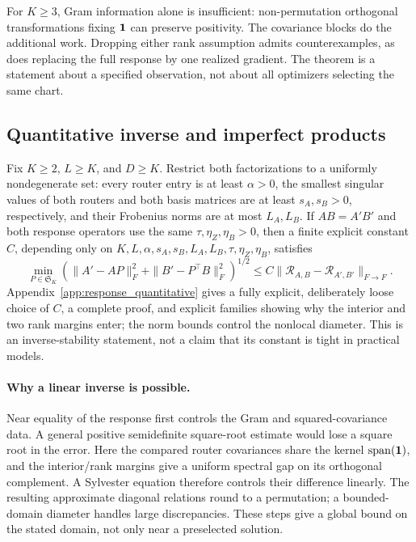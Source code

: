 For $K\ge3$, Gram information alone is insufficient: non-permutation orthogonal
transformations fixing $\mathbf{1}$ can preserve positivity. The covariance
blocks do the additional work. Dropping either rank assumption admits
counterexamples, as does replacing the full response by one realized
gradient. The theorem is a statement about a specified observation, not
about all optimizers selecting the same chart.

\subsection{Quantitative inverse and imperfect products}
\label{sec:quantitative}

\begin{corollary}
\label{cor:response_stability}
Fix \(K\ge2\), \(L\ge K\), and \(D\ge K\).  Restrict both
factorizations to a uniformly nondegenerate set: every router entry is at
least \(\alpha>0\), the smallest singular values of both routers and both
basis matrices are at least \(s_A,s_B>0\), respectively, and their Frobenius
norms are at most \(L_A,L_B\).  If \(AB=A'B'\) and both response operators
use the same \(\tau,\eta_Z,\eta_B>0\), then a finite explicit constant \(C\),
depending only on
\(K,L,\alpha,s_A,s_B,L_A,L_B,\tau,\eta_Z,\eta_B\), satisfies
\begin{equation}
 \min_{P\in\mathfrak S_K}
 \left(\|A'-AP\|_F^2+\|B'-P^\top B\|_F^2\right)^{1/2}
 \le C\|\mathcal R_{A,B}-\mathcal R_{A',B'}\|_{F\to F}.
 \label{eq:response_stability_main}
\end{equation}
Appendix~\ref{app:response_quantitative} gives a fully explicit, deliberately
loose choice of \(C\), a complete proof, and explicit families showing why
the interior and two rank margins enter; the norm bounds control the nonlocal
diameter.  This is an inverse-stability statement, not a claim that its
constant is tight in practical models.
\end{corollary}


\paragraph{Why a linear inverse is possible.}
Near equality of the response first controls the Gram and squared-covariance
data. A general positive semidefinite square-root estimate would lose a
square root in the error. Here the compared router covariances share the
kernel $\operatorname{span}(\mathbf{1})$, and the interior/rank margins give
a uniform spectral gap on its orthogonal complement. A Sylvester equation
therefore controls their difference linearly. The resulting approximate
diagonal relations round to a permutation; a bounded-domain diameter
handles large discrepancies. These steps give a global bound on the stated
domain, not only near a preselected solution.

